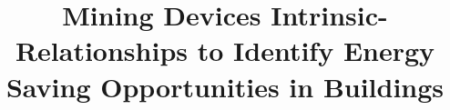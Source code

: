 \documentclass{sig-alternate-ipsn13}
\title{Mining Devices Intrinsic-Relationships to Identify Energy Saving Opportunities in Buildings}
\begin{document}
\maketitle



















\small


\end{document}
